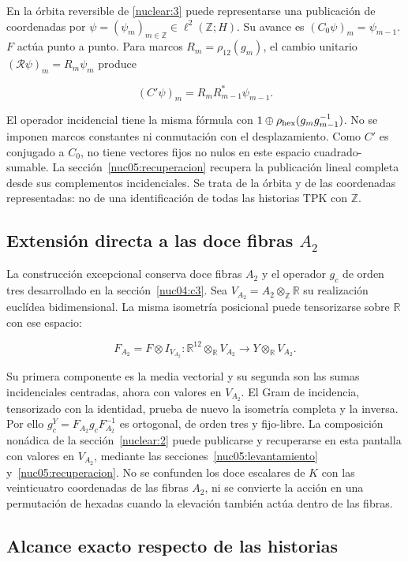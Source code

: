 En la órbita reversible de \cref{nuclear:3} puede representarse una publicación de coordenadas por \(\psi=(\psi_m)_{m\in\mathbb Z}\in\ell^2(\mathbb Z;H)\). Su avance es \((C_0\psi)_m=\psi_{m-1}\). \(F\) actúa punto a punto. Para marcos \(R_m=\rho_{12}(g_m)\), el cambio unitario \((\mathscr R\psi)_m=R_m\psi_m\) produce

\[
(C'\psi)_m=R_mR_{m-1}^*\psi_{m-1}.
\]

El operador incidencial tiene la misma fórmula con \(1\oplus\rho_{\rm hex}(g_mg_{m-1}^{-1})\). No se imponen marcos constantes ni conmutación con el desplazamiento. Como \(C'\) es conjugado a \(C_0\), no tiene vectores fijos no nulos en este espacio cuadrado-sumable. La sección~\ref{nuc05:recuperacion} recupera la publicación lineal completa desde sus complementos incidenciales. Se trata de la órbita y de las coordenadas representadas: no de una identificación de todas las historias TPK con \(\mathbb Z\).

\subsection{Extensión directa a las doce fibras \texorpdfstring{\(A_2\)}{A2}}\label{nuc05:a2}

La construcción excepcional conserva doce fibras \(A_2\) y el operador \(g_c\) de orden tres desarrollado en la sección~\ref{nuc04:c3}. Sea \(V_{A_2}=A_2\otimes_{\mathbb Z}\mathbb R\) su realización euclídea bidimensional. La misma isometría posicional puede tensorizarse sobre \(\mathbb R\) con ese espacio:

\[
F_{A_2}=F\otimes I_{V_{A_2}}:
\mathbb R^{12}\otimes_{\mathbb R}V_{A_2}
\longrightarrow Y\otimes_{\mathbb R}V_{A_2}.
\]

Su primera componente es la media vectorial y su segunda son las sumas incidenciales centradas, ahora con valores en \(V_{A_2}\). El Gram de incidencia, tensorizado con la identidad, prueba de nuevo la isometría completa y la inversa. Por ello \(g_c^Y=F_{A_2}g_cF_{A_2}^{-1}\) es ortogonal, de orden tres y fijo-libre. La composición nonádica de la sección~\ref{nuclear:2} puede publicarse y recuperarse en esta pantalla con valores en \(V_{A_2}\), mediante las secciones~\ref{nuc05:levantamiento} y~\ref{nuc05:recuperacion}. No se confunden los doce escalares de \(K\) con las veinticuatro coordenadas de las fibras \(A_2\), ni se convierte la acción en una permutación de hexadas cuando la elevación también actúa dentro de las fibras.

\subsection{Alcance exacto respecto de las historias}

